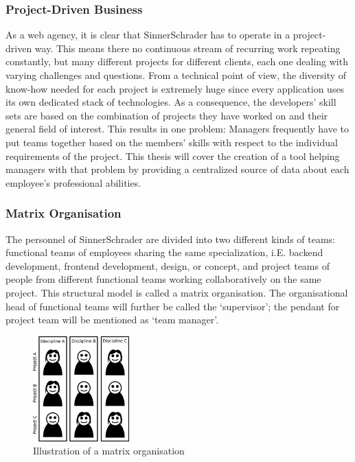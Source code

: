 \subsubsection{Project-Driven Business}
As a web agency, it is clear that SinnerSchrader has to operate in a project-driven way. This means there no continuous stream of recurring work repeating constantly, but many different projects for different clients, each one dealing with varying challenges and questions. From a technical point of view, the diversity of know-how needed for each project is extremely huge since every application uses its own dedicated stack of technologies. As a consequence, the developers’ skill sets are based on the combination of projects they have worked on and their general field of interest. This results in one problem: Managers frequently have to put teams together based on the members’ skills with respect to the individual requirements of the project.\newline
This thesis will cover the creation of a tool helping managers with that problem by providing a centralized source of data about each employee’s professional abilities.

\subsubsection{Matrix Organisation}
The personnel of SinnerSchrader are divided into two different kinds of teams: functional teams of
employees sharing the same specialization, i.E. backend development, frontend development, design, or concept, and project teams of people from different functional teams working collaboratively on the same project. This structural model is called a matrix organisation. \cite[P. 75]{BWL}
The organisational head of functional teams will further be called the `supervisor'; the pendant for project team will be mentioned as `team manager'.

\begin{figure}[!htp]
    \centering
    \includegraphics[width=0.33\textwidth]{images/matrixorga.png}
    \caption[Matrix Organisation]{Illustration of a matrix organisation}
    \label{fig:matrixorga}
\end{figure}



